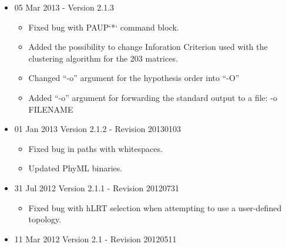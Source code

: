 \documentclass[11pt,twoside,a4paper]{article}
\begin{document}
\begin{itemize}
	\item 05 Mar 2013 - Version 2.1.3

	\begin{itemize}
		\item Fixed bug with PAUP`*` command block.
		\item Added the possibility to change Inforation Criterion used with the clustering algorithm for the 203 matrices.
		\item Changed ``-o'' argument for the hypothesis order into ``-O''
		\item Added ``-o'' argument for forwarding the standard output to a file: -o FILENAME 
	\end{itemize}

	\item 01 Jan 2013 Version 2.1.2 - Revision 20130103

	\begin{itemize}
		\item Fixed bug in paths with whitespaces.
		\item Updated PhyML binaries. 
	\end{itemize}

	\item 31 Jul 2012 Version 2.1.1 - Revision 20120731

	\begin{itemize}
		\item Fixed bug with hLRT selection when attempting to use a user-defined topology. 
	\end{itemize}

	\item 11 Mar 2012 Version 2.1 - Revision 20120511


\end{itemize}
\end{document}
